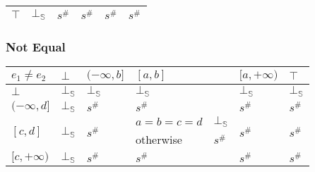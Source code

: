 \documentclass[aspectratio=169]{beamer}
\begin{document}
\begin{frame}
\begin{table}
{\begin{tabular}{|l|l|ll|ll|ll|l|}
        $\top$                          & $\bot_\mathbb{S}$                  & \multicolumn{2}{l|}{$s^\#$}                                                        & \multicolumn{2}{l|}{$s^\#$}                                    & \multicolumn{2}{l|}{$s^\#$}                                                  & $s^\#$                                          \\ \hline
        \end{tabular}}
        \end{table}
    \end{frame}
    
        \begin{frame}
            \frametitle{Not Equal}
    \begin{table}
        \begin{tabular}{|l|l|ll|ll|ll|l|}
        \hline
        $e_1 \ne e_2$                   & $\bot$                  & \multicolumn{2}{l|}{$(-\infty, b]$}          & \multicolumn{2}{l|}{$[a, b]$}                & \multicolumn{2}{l|}{$[a, +\infty)$}          & $\top$                  \\ \hline
        $\bot$                          & $\bot_\mathbb{S}$                  & \multicolumn{2}{l|}{$\bot_\mathbb{S}$}                  & \multicolumn{2}{l|}{$\bot_\mathbb{S}$}                  & \multicolumn{2}{l|}{$\bot_\mathbb{S}$}                  & $\bot_\mathbb{S}$                  \\ \hline
        $(-\infty, d]$                  & $\bot_\mathbb{S}$                  & \multicolumn{2}{l|}{$s^\#$}                  & $s^\#$                     &                 & \multicolumn{2}{l|}{$s^\#$}                  & $s^\#$                  \\ \hline
        \multirow{2}{*}{$[c, d]$}       & \multirow{2}{*}{$\bot_\mathbb{S}$} & \multicolumn{2}{l|}{\multirow{2}{*}{$s^\#$}} & $a = b = c = d$            & $\bot_\mathbb{S}$          & \multicolumn{2}{l|}{\multirow{2}{*}{$s^\#$}} & \multirow{2}{*}{$s^\#$} \\
                                        &                         & \multicolumn{2}{l|}{}                        & otherwise                  & $s^\#$          & \multicolumn{2}{l|}{}                        &                         \\ \hline
        \multirow{3}{*}{$[c, +\infty)$} & \multirow{3}{*}{$\bot_\mathbb{S}$} & \multicolumn{2}{l|}{\multirow{3}{*}{$s^\#$}} & \multicolumn{2}{l|}{\multirow{3}{*}{$s^\#$}} & \multicolumn{2}{l|}{\multirow{3}{*}{$s^\#$}} & \multirow{3}{*}{$s^\#$} \\

\end{tabular}
\end{table}
\end{frame}
\end{document}
